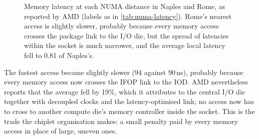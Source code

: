 \begin{figure}[htbp]
\centering
{}
\caption[Memory latency at each NUMA distance in Naples and Rome, as reported by AMD]{Memory latency at each NUMA distance in Naples and Rome, as reported by AMD \cite[Fig.~2.2.6]{naffziger2020chiplet} (labels as in \cref{tab:numa-latency}). Rome's nearest access is slightly slower, probably because every memory access crosses the package link to the I/O die, but the spread of latencies within the socket is much narrower, and the average local latency fell to 0.81 of Naples's.}
\label{fig:numa-latency}
\end{figure}


The fastest access became slightly slower (94 against 90\,ns), probably because every memory access now crosses the IFOP link to the IOD. AMD nevertheless reports that the average fell by 19\%, which it attributes to the central I/O die together with decoupled clocks and the latency-optimised link; no access now has to cross to another compute die's memory controller inside the socket. This is the trade the chiplet organisation makes: a small penalty paid by every memory access in place of large, uneven ones.

